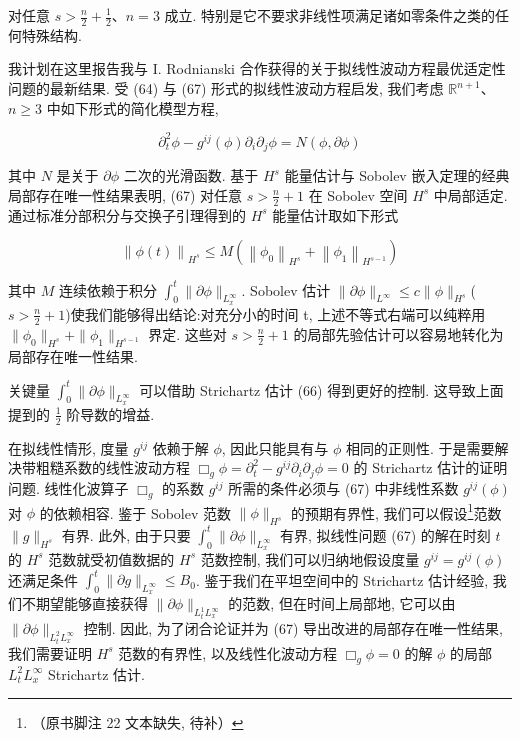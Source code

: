 对任意 $s > \frac{n}{2} + \frac{1}{2}$、$n = 3$ 成立. 特别是它不要求非线性项满足诸如零条件之类的任何特殊结构. 


我计划在这里报告我与 I. Rodnianski \cite{gfref42} 合作获得的关于拟线性波动方程最优适定性问题的最新结果. 受 (64) 与 (67) 形式的拟线性波动方程启发, 我们考虑 $\mathbb{R}^{n + 1}$、$n\geq 3$ 中如下形式的简化模型方程, 

\begin{equation}
\partial_ {t} ^ {2} \phi - g ^ {i j} (\phi) \partial_ {i} \partial_ {j} \phi = N (\phi ,  \partial \phi)\label{eq:cG-67}
\end{equation}

其中 $N$ 是关于 $\partial\phi$ 二次的光滑函数. 基于 $H^{s}$ 能量估计与 Sobolev 嵌入定理的经典局部存在唯一性结果表明, (67) 对任意 $s > \frac{n}{2} + 1$ 在 Sobolev 空间 $H^{s}$ 中局部适定. 通过标准分部积分与交换子引理得到的 $H^{s}$ 能量估计取如下形式

\[
\left\| \phi (t) \right\| _ {H ^ {s}} \leq M \left(\left\| \phi_ {0} \right\| _ {H ^ {s}} + \left\| \phi_ {1} \right\| _ {H ^ {s - 1}}\right)
\]

其中 $M$ 连续依赖于积分 $\int_{0}^{t}\|\partial\phi\|_{L_{x}^{\infty}}$. Sobolev 估计 $\|\partial\phi\|_{L^{\infty}}\leq c\|\phi\|_{H^{s}}$($s>\frac{n}{2}+1$)使我们能够得出结论:对充分小的时间 t, 上述不等式右端可以纯粹用 $\|\phi_{0}\|_{H^{s}}+\|\phi_{1}\|_{H^{s-1}}$ 界定. 这些对 $s>\frac{n}{2}+1$ 的局部先验估计可以容易地转化为局部存在唯一性结果. 

关键量 $\int_{0}^{t}\|\partial\phi\|_{L_{x}^{\infty}}$ 可以借助 Strichartz 估计 (66) 得到更好的控制. 这导致上面提到的 $\frac{1}{2}$ 阶导数的增益. 

在拟线性情形, 度量 $g^{ij}$ 依赖于解 $\phi$, 因此只能具有与 $\phi$ 相同的正则性. 于是需要解决带粗糙系数的线性波动方程 $\Box_{g}\phi = \partial_{t}^{2} - g^{ij}\partial_{i}\partial_{j}\phi = 0$ 的 Strichartz 估计的证明问题. 线性化波算子 $\Box_{g}$ 的系数 $g^{ij}$ 所需的条件必须与 (67) 中非线性系数 $g^{ij}(\phi)$ 对 $\phi$ 的依赖相容. 鉴于 Sobolev 范数 $\|\phi\|_{H^{s}}$ 的预期有界性, 我们可以假设\footnote{（原书脚注 22 文本缺失, 待补）}范数 $\|g\|_{H^{s}}$ 有界. 此外, 由于只要 $\int_{0}^{t}\|\partial\phi\|_{L_{x}^{\infty}}$ 有界, 拟线性问题 (67) 的解在时刻 $t$ 的 $H^{s}$ 范数就受初值数据的 $H^{s}$ 范数控制, 我们可以归纳地假设度量 $g^{ij} = g^{ij}(\phi)$ 还满足条件 $\int_{0}^{t}\|\partial g\|_{L_{x}^{\infty}} \leq B_{0}$. 鉴于我们在平坦空间中的 Strichartz 估计经验, 我们不期望能够直接获得 $\|\partial\phi\|_{L_{t}^{1}L_{x}^{\infty}}$ 的范数, 但在时间上局部地, 它可以由 $\|\partial\phi\|_{L_{t}^{2}L_{x}^{\infty}}$ 控制. 因此, 为了闭合论证并为 (67) 导出改进的局部存在唯一性结果, 我们需要证明 $H^{s}$ 范数的有界性, 以及线性化波动方程 $\Box_{g}\phi = 0$ 的解 $\phi$ 的局部 $L_{t}^{2}L_{x}^{\infty}$ Strichartz 估计. 

